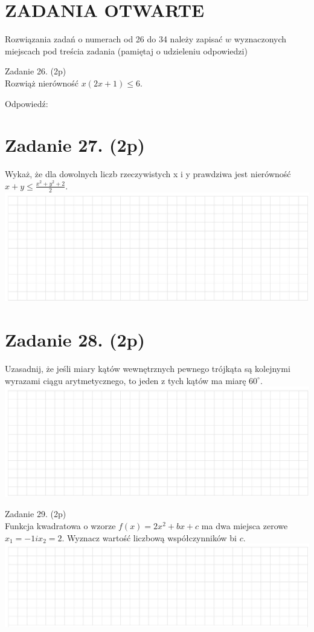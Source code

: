 \documentclass[10pt]{article}
\begin{document}
\section*{ZADANIA OTWARTE}
Rozwiązania zadań o numerach od 26 do 34 należy zapisać \(w\) wyznaczonych miejscach pod treścia zadania (pamiętaj o udzieleniu odpowiedzi)

Zadanie 26. (2p)\\
Rozwiąż nierówność \(x(2 x+1) \leq 6\).

Odpowiedź:

\section*{Zadanie 27. (2p)}
Wykaż, że dla dowolnych liczb rzeczywistych x i y prawdziwa jest nierówność \(x+y \leq \frac{x^{2}+y^{2}+2}{2}\).\\
\includegraphics[max width=\textwidth, center]{2024_11_21_fb7e622176e162773107g-09}

\section*{Zadanie 28. (2p)}
Uzasadnij, że jeśli miary kątów wewnętrznych pewnego trójkąta są kolejnymi wyrazami ciągu arytmetycznego, to jeden z tych kątów ma miarę \(60^{\circ}\).\\
\includegraphics[max width=\textwidth, center]{2024_11_21_fb7e622176e162773107g-09(1)}

Zadanie 29. (2p)\\
Funkcja kwadratowa o wzorze \(f(x)=2 x^{2}+b x+c\) ma dwa miejsca zerowe \(x_{1}=-1 i x_{2}=2\). Wyznacz wartość liczbową współczynników bi \(c\).\\
\includegraphics[max width=\textwidth, center]{2024_11_21_fb7e622176e162773107g-10}
\end{document}
